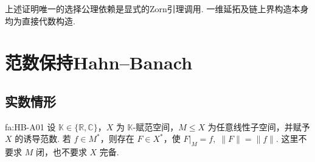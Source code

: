 \begin{FARemark}[选择公理依赖]
上述证明唯一的选择公理依赖是显式的Zorn引理调用. 一维延拓及链上界构造本身均为直接代数构造.
\end{FARemark}

\section{范数保持Hahn--Banach}\label{sec:i06-norm-preserving-hb}

\subsection{实数情形}

\begin{FATheorem}{fa:HB-A01}
设 \(\displaystyle \mathbb K\in\{\mathbb R,\mathbb C\}\)，\(\displaystyle X\) 为 \(\displaystyle \mathbb K\)-赋范空间，\(\displaystyle M\leqslant X\) 为任意线性子空间，并赋予 \(\displaystyle X\) 的诱导范数. 若 \(\displaystyle f\in M^*\)，则存在 \(\displaystyle F\in X^*\)，使 \(\displaystyle F|_M=f, \; \|F\|=\|f\|\).
这里不要求 \(\displaystyle M\) 闭，也不要求 \(\displaystyle X\) 完备.
\end{FATheorem}

